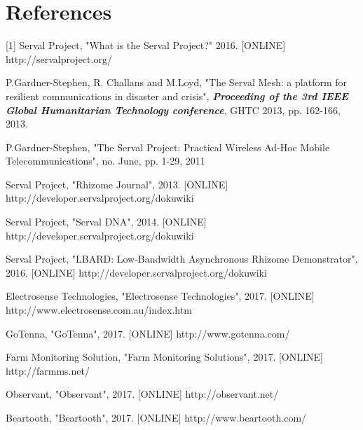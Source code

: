 \chapter{References}

[1] Serval Project, "What is the Serval Project?" 2016. [ONLINE] http://servalproject.org/ 
\par
[2] P.Gardner-Stephen, R. Challans and M.Loyd, "The Serval Mesh: a platform for resilient communications in disaster and crisis", \textbf{\textit{Proceeding of the 3rd IEEE Global Humanitarian Technology conference}}, GHTC 2013, pp. 162-166, 2013.
\par
[3] P.Gardner-Stephen, "The Serval Project: Practical Wireless Ad-Hoc Mobile Telecommunications", no. June, pp. 1-29, 2011
\par
[4] Serval Project, "Rhizome Journal", 2013. [ONLINE] http://developer.servalproject.org/dokuwiki
\par
[5] Serval Project, "Serval DNA", 2014. [ONLINE] http://developer.servalproject.org/dokuwiki
\par
[6] Serval Project, "LBARD: Low-Bandwidth Asynchronous Rhizome Demonstrator", 2016. [ONLINE] http://developer.servalproject.org/dokuwiki
\par
[7] Electrosense Technologies, "Electrosense Technologies", 2017. [ONLINE] http://www.electrosense.com.au/index.htm
\par
[8] GoTenna, "GoTenna", 2017. [ONLINE] http://www.gotenna.com/
\par
[9] Farm Monitoring Solution, "Farm Monitoring Solutions", 2017. [ONLINE] http://farmms.net/
\par
[10] Observant, "Observant", 2017. [ONLINE] http://observant.net/
\par
[11] Beartooth, "Beartooth", 2017. [ONLINE] http://www.beartooth.com/
